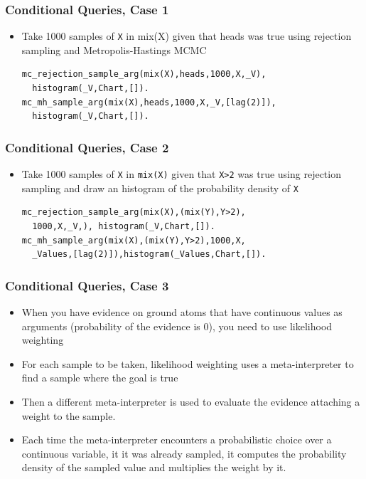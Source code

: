 \documentclass[trans]{beamer}
\begin{document}
\begin{frame}[fragile]
  \frametitle{Conditional Queries, Case 1}
  \begin{itemize}
  \item Take 1000 samples of \verb|X| in mix(X) given that heads was true using rejection sampling and Metropolis-Hastings MCMC
\begin{verbatim}
mc_rejection_sample_arg(mix(X),heads,1000,X,_V), 
  histogram(_V,Chart,[]).
mc_mh_sample_arg(mix(X),heads,1000,X,_V,[lag(2)]), 
  histogram(_V,Chart,[]).
\end{verbatim}
  \end{itemize}
\end{frame}
\begin{frame}[fragile]
  \frametitle{Conditional Queries, Case 2}
  \begin{itemize}
  \item Take 1000 samples of \verb|X| in \verb|mix(X)| given that \verb|X>2| was true using rejection sampling and draw an histogram of the probability density of \verb|X|
\begin{verbatim}
mc_rejection_sample_arg(mix(X),(mix(Y),Y>2),
  1000,X,_V,), histogram(_V,Chart,[]).
mc_mh_sample_arg(mix(X),(mix(Y),Y>2),1000,X,
  _Values,[lag(2)]),histogram(_Values,Chart,[]).
\end{verbatim}
  \end{itemize}
\end{frame}
\begin{frame}
  \frametitle{Conditional Queries, Case 3}
   \begin{itemize}
  \item  When you have evidence on ground atoms that have continuous values as arguments (probability of the evidence is 0),  you need to use likelihood weighting 
  \item
  For each sample to be taken, likelihood weighting uses a meta-interpreter to find a sample where the goal is true
  \item Then a different meta-interpreter is used to evaluate the evidence attaching a  weight to the sample.
  \item  Each time the meta-interpreter encounters a probabilistic choice over a continuous variable, it it was already  sampled, it computes the probability density of the sampled value and multiplies the weight by it.     \end{itemize}
\end{frame}
\end{document}
